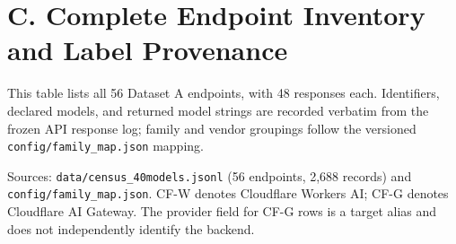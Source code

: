 \documentclass[10pt,letterpaper]{article}
\theoremstyle{definition}
\begin{document}
\section*{C. Complete Endpoint Inventory and Label Provenance}

This table lists all 56 Dataset A endpoints, with 48 responses each. Identifiers, declared models, and returned model strings are recorded verbatim from the frozen API response log; family and vendor groupings follow the versioned \texttt{config/\allowbreak{}family\_\allowbreak{}map.\allowbreak{}json} mapping.


Sources: \texttt{data/\allowbreak{}census\_\allowbreak{}40models.\allowbreak{}jsonl} (56 endpoints, 2,688 records) and \texttt{config/\allowbreak{}family\_\allowbreak{}map.\allowbreak{}json}. CF-W denotes Cloudflare Workers AI; CF-G denotes Cloudflare AI Gateway. The provider field for CF-G rows is a target alias and does not independently identify the backend.
\end{document}

